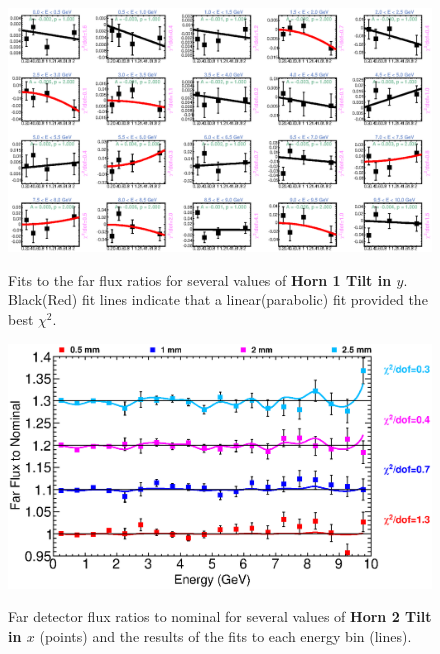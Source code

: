 \begin{figure}[ht]
  \begin{center}
    {\includegraphics[width=5.0in]{figures/Horn1YTilt_far_fits.eps}}
  \end{center}
\caption{ Fits to the far flux ratios for several values of {\bf Horn 1 Tilt in $y$}. Black(Red) fit lines indicate that a linear(parabolic) fit provided the best $\chi^2$. }
\end{figure}

\clearpage

\begin{figure}[ht]
  \begin{center}
    {\includegraphics[width=6.0in]{figures/Horn2XTilt_far_summary.eps}}
  \end{center}
\caption{ Far detector flux ratios to nominal for several values of {\bf Horn 2 Tilt in $x$} (points) and the results of the fits to each energy bin (lines).}
\end{figure}

